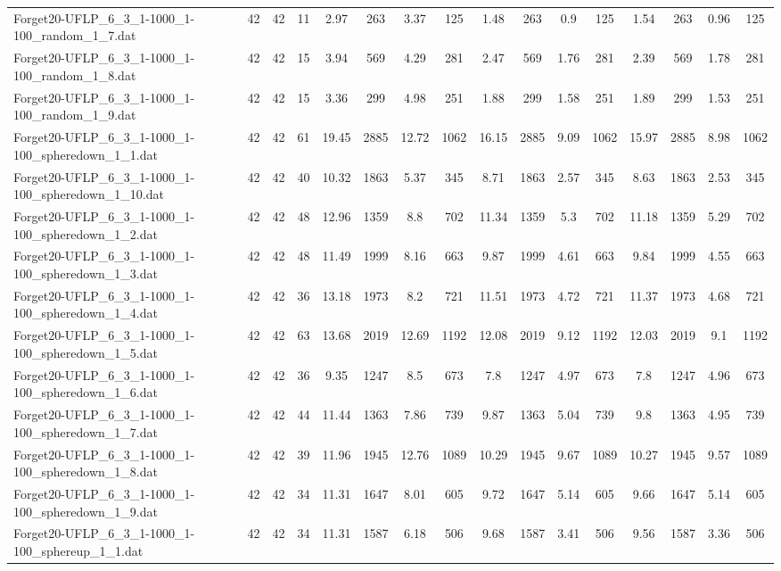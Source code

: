 \begin{sidewaystable}[!ht]
{\begin{tabular}{lccccccccccccccc}
Forget20-UFLP\_6\_3\_1-1000\_1-100\_random\_1\_7.dat & 42 & 42 & 11 & 2.97 & 263 & 3.37 & 125 & 1.48 & 263 & 0.9 & 125 & 1.54 & 263 & 0.96 & 125 \\
Forget20-UFLP\_6\_3\_1-1000\_1-100\_random\_1\_8.dat & 42 & 42 & 15 & 3.94 & 569 & 4.29 & 281 & 2.47 & 569 & 1.76 & 281 & 2.39 & 569 & 1.78 & 281 \\
Forget20-UFLP\_6\_3\_1-1000\_1-100\_random\_1\_9.dat & 42 & 42 & 15 & 3.36 & 299 & 4.98 & 251 & 1.88 & 299 & 1.58 & 251 & 1.89 & 299 & 1.53 & 251 \\
Forget20-UFLP\_6\_3\_1-1000\_1-100\_spheredown\_1\_1.dat & 42 & 42 & 61 & 19.45 & 2885 & 12.72 & 1062 & 16.15 & 2885 & 9.09 & 1062 & 15.97 & 2885 & 8.98 & 1062 \\
Forget20-UFLP\_6\_3\_1-1000\_1-100\_spheredown\_1\_10.dat & 42 & 42 & 40 & 10.32 & 1863 & 5.37 & 345 & 8.71 & 1863 & 2.57 & 345 & 8.63 & 1863 & 2.53 & 345 \\
Forget20-UFLP\_6\_3\_1-1000\_1-100\_spheredown\_1\_2.dat & 42 & 42 & 48 & 12.96 & 1359 & 8.8 & 702 & 11.34 & 1359 & 5.3 & 702 & 11.18 & 1359 & 5.29 & 702 \\
Forget20-UFLP\_6\_3\_1-1000\_1-100\_spheredown\_1\_3.dat & 42 & 42 & 48 & 11.49 & 1999 & 8.16 & 663 & 9.87 & 1999 & 4.61 & 663 & 9.84 & 1999 &  \textcolor{blue2}{4.55} & 663 \\
Forget20-UFLP\_6\_3\_1-1000\_1-100\_spheredown\_1\_4.dat & 42 & 42 & 36 & 13.18 & 1973 & 8.2 & 721 & 11.51 & 1973 & 4.72 & 721 & 11.37 & 1973 &  \textcolor{blue2}{4.68} & 721 \\
Forget20-UFLP\_6\_3\_1-1000\_1-100\_spheredown\_1\_5.dat & 42 & 42 & 63 & 13.68 & 2019 & 12.69 & 1192 & 12.08 & 2019 & 9.12 & 1192 & 12.03 & 2019 & 9.1 & 1192 \\
Forget20-UFLP\_6\_3\_1-1000\_1-100\_spheredown\_1\_6.dat & 42 & 42 & 36 & 9.35 & 1247 & 8.5 & 673 & 7.8 & 1247 & 4.97 & 673 & 7.8 & 1247 & 4.96 & 673 \\
Forget20-UFLP\_6\_3\_1-1000\_1-100\_spheredown\_1\_7.dat & 42 & 42 & 44 & 11.44 & 1363 & 7.86 & 739 & 9.87 & 1363 & 5.04 & 739 & 9.8 & 1363 & 4.95 & 739 \\
Forget20-UFLP\_6\_3\_1-1000\_1-100\_spheredown\_1\_8.dat & 42 & 42 & 39 & 11.96 & 1945 & 12.76 & 1089 & 10.29 & 1945 & 9.67 & 1089 & 10.27 & 1945 & 9.57 & 1089 \\
Forget20-UFLP\_6\_3\_1-1000\_1-100\_spheredown\_1\_9.dat & 42 & 42 & 34 & 11.31 & 1647 & 8.01 & 605 & 9.72 & 1647 & 5.14 & 605 & 9.66 & 1647 & 5.14 & 605 \\
Forget20-UFLP\_6\_3\_1-1000\_1-100\_sphereup\_1\_1.dat & 42 & 42 & 34 & 11.31 & 1587 & 6.18 & 506 & 9.68 & 1587 & 3.41 & 506 & 9.56 & 1587 &  \textcolor{blue2}{3.36} & 506 \\

\end{tabular}}
\end{sidewaystable}
